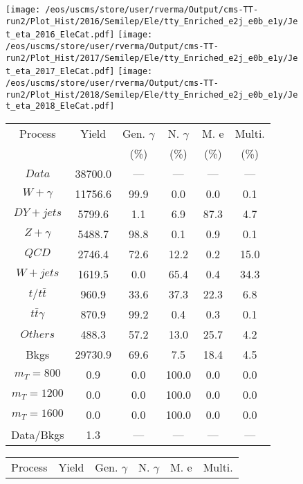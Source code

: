 \begin{figure}
\centering
\texttt{[image: /eos/uscms/store/user/rverma/Output/cms-TT-run2/Plot\_Hist/2016/Semilep/Ele/tty\_Enriched\_e2j\_e0b\_e1y/Jet\_eta\_2016\_EleCat.pdf]}
\texttt{[image: /eos/uscms/store/user/rverma/Output/cms-TT-run2/Plot\_Hist/2017/Semilep/Ele/tty\_Enriched\_e2j\_e0b\_e1y/Jet\_eta\_2017\_EleCat.pdf]}
\texttt{[image: /eos/uscms/store/user/rverma/Output/cms-TT-run2/Plot\_Hist/2018/Semilep/Ele/tty\_Enriched\_e2j\_e0b\_e1y/Jet\_eta\_2018\_EleCat.pdf]}
\begin{minipage}[c]{0.32\textwidth}
\centering
\tiny{
\begin{tabular}{cccccc}
\hline
Process & Yield & Gen. $\gamma$ & N. $\gamma$ & M. e & Multi. \\
 &  & (\%) & (\%) & (\%) & (\%)  \\
\hline
                                                                      $ Data $ &  38700.0 &  --- &  --- &  --- &  ---\\
$ W+\gamma $ &  11756.6 &  99.9 &  0.0 &  0.0 &  0.1\\
$ DY+jets $ &  5799.6 &  1.1 &  6.9 &  87.3 &  4.7\\
$ Z+\gamma $ &  5488.7 &  98.8 &  0.1 &  0.9 &  0.1\\
$ QCD $ &  2746.4 &  72.6 &  12.2 &  0.2 &  15.0\\
$ W+jets $ &  1619.5 &  0.0 &  65.4 &  0.4 &  34.3\\
$ t/t\bar{t} $ &  960.9 &  33.6 &  37.3 &  22.3 &  6.8\\
$ t\bar{t}\gamma $ &  870.9 &  99.2 &  0.4 &  0.3 &  0.1\\
$ Others $ &  488.3 &  57.2 &  13.0 &  25.7 &  4.2\\
Bkgs &  29730.9 &  69.6 &  7.5 &  18.4 &  4.5\\
$ m_{T} = 800 $ &  0.9 &  0.0 &  100.0 &  0.0 &  0.0\\
$ m_{T} = 1200 $ &  0.0 &  0.0 &  100.0 &  0.0 &  0.0\\
$ m_{T} = 1600 $ &  0.0 &  0.0 &  100.0 &  0.0 &  0.0\\
Data/Bkgs &  1.3 &  --- &  --- &  --- &  ---\\
\hline
\end{tabular}
}
\end{minipage}
\begin{minipage}[c]{0.32\textwidth}
\centering
\tiny{
\begin{tabular}{cccccc}
\hline
Process & Yield & Gen. $\gamma$ & N. $\gamma$ & M. e & Multi. \\

\end{tabular}}
\end{minipage}
\end{figure}
